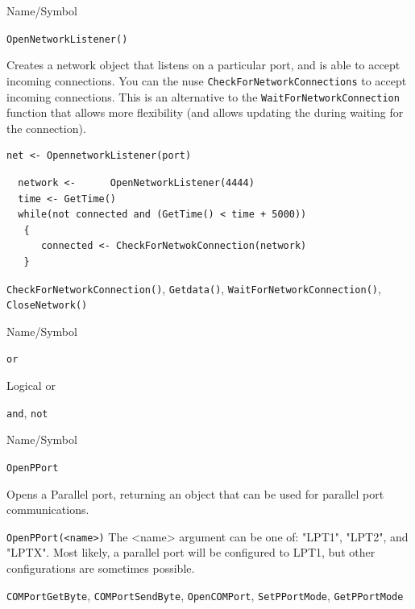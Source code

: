 \begin{desc}{Name/Symbol}
\item[Name/Symbol]	\verb+OpenNetworkListener()+

\item[Description] Creates a network object that listens on a particular port, and is able to accept incoming connections. You can the nuse \verb+CheckForNetworkConnections+ to accept incoming connections.  
This is an alternative to the \verb+WaitForNetworkConnection+ function that allows more flexibility (and allows updating the during waiting for the connection).

\item[Usage]
\begin{verbatim}
net <- OpennetworkListener(port)
\end{verbatim}

\item[Example]	
\begin{verbatim}
  network <-      OpenNetworkListener(4444) 
  time <- GetTime()
  while(not connected and (GetTime() < time + 5000))
   {
      connected <- CheckForNetwokConnection(network) 
   }

\end{verbatim}
\item[See Also]	\verb+CheckForNetworkConnection()+, \verb+Getdata()+, \verb+WaitForNetworkConnection()+, \verb+CloseNetwork()+
\end{desc}


\begin{desc}{Name/Symbol}
\item[Name/Symbol]	\verb+or+                   

\item[Description]	Logical or

\item[Usage]		

\item[Example]	

\item[See Also]	\verb+and+, \verb+not+
\end{desc}



\begin{desc}{Name/Symbol}
\item[Name/Symbol] \verb+OpenPPort+ 

\item[Description]  
  Opens a Parallel  port, returning an object that can be used for parallel port communications.
\item[Usage]       
     \verb+OpenPPort(<name>)+ 
 The <name> argument can be one of: "LPT1", "LPT2", and "LPTX".  Most likely, a parallel port will be configured to 
LPT1, but other configurations are sometimes possible. 
\item[Example]

\item[See Also]
\verb+COMPortGetByte+, \verb+COMPortSendByte+, \verb+OpenCOMPort+, \verb+SetPPortMode+, \verb+GetPPortMode+ 
\end{desc} 





